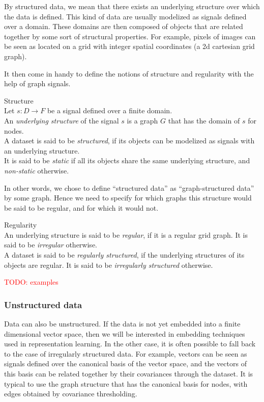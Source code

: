 By structured data, we mean that there exists an underlying structure over which the data is defined. This kind of data are usually modelized as signals defined over a domain. These domains are then composed of objects that are related together by some sort of structural properties. For example, pixels of images can be seen as located on a grid with integer spatial coordinates (a 2d cartesian grid graph).

It then come in handy to define the notions of structure and regularity with the help of graph signals.

\begin{definition}{Structure}\\
  Let $s: D \rightarrow F$ be a signal defined over a finite domain.\\
  An \emph{underlying structure} of the signal $s$ is a graph $G$ that has the domain of $s$ for nodes.\\
  A dataset is said to be \emph{structured}, if its objects can be modelized as signals with an underlying structure.\\
  It is said to be \emph{static} if all its objects share the same underlying structure, and \emph{non-static} otherwise.
\end{definition}

In other words, we chose to define ``structured data'' as ``graph-structured data'' by some graph. Hence we need to specify for which graphs this structure would be said to be regular, and for which it would not.

\begin{definition}{Regularity}\\
An underlying structure is said to be \emph{regular}, if it is a regular grid graph.
It is said to be \emph{irregular} otherwise.\\
A dataset is said to be \emph{regularly structured}, if the underlying structures of its objects are regular.
It is said to be \emph{irregularly structured} otherwise.
\end{definition}


\textcolor{red}{TODO: examples}

\subsubsection{Unstructured data}

Data can also be unstructured. If the data is not yet embedded into a finite dimensional vector space, then we will be interested in embedding techniques used in representation learning. In the other case, it is often possible to fall back to the case of irregularly structured data. For example, vectors can be seen as signals defined over the canonical basis of the vector space, and the vectors of this basis can be related together by their covariances through the dataset. It is typical to use the graph structure that has the canonical basis for nodes, with edges obtained by covariance thresholding.

